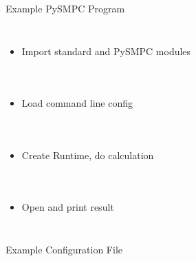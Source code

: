\documentclass[t,noamsthm]{beamer}
\begin{document}
\begin{frame}{Example PySMPC Program}

\mbox{}\vspace{-2\baselineskip}

\begin{columns}
  
  \begin{itemize}
  \item Import standard and PySMPC modules
  \end{itemize}
\end{columns}

\vspace{-0.75\baselineskip}

\begin{columns}
  \begin{itemize}
  \item<2-> Load command line config
  \end{itemize}
\end{columns}

\vspace{-0.75\baselineskip}

\begin{columns}
  \begin{itemize}
  \item<3-> Create Runtime, do calculation
  \end{itemize}
\end{columns}

\vspace{-0.75\baselineskip}

\begin{columns}
  \begin{itemize}
  \item<4-> Open and print result
  \end{itemize}
\end{columns}

\end{frame}

\begin{frame}{Example Configuration File}


  

\end{frame}
\end{document}
